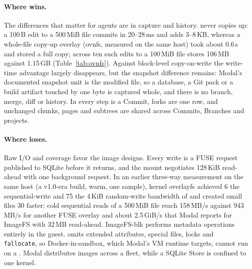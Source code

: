 \paragraph{Where \sys{} wins.} The differences that matter for agents are in capture and
history. \sys{} never copies up: a 100\,B edit to a 500\,MiB file commits in 20--28\,ms
and adds 3--8\,KB, whereas a whole-file copy-up overlay (ovnfs, measured on the same
host) took about 0.6\,s and stored a full copy; across ten such edits to a 100\,MiB file
\sys{} stores 106\,MB against 1.15\,GB (Table~\ref{tab:ovnfs}). Against block-level
copy-on-write the write-time advantage largely disappears, but the snapshot difference
remains: Modal's documented snapshot unit is the modified file, so a database, a Git
pack or a build artifact touched by one byte is captured whole, and there is no
branch, merge, diff or history. In \sys{} every step is a Commit, forks are one row,
and unchanged chunks, pages and subtrees are shared across Commits, Branches and
projects.

\paragraph{Where \sys{} loses.} Raw I/O and coverage favor the image designs. Every
\sys{} write is a FUSE request published to SQLite before it returns, and the mount
negotiates 128\,KiB read-ahead with one background request. In an earlier three-way
measurement on the same host (a v1.0-era build, warm, one sample), kernel overlayfs
achieved 6\X{} the sequential-write and 75\X{} the 4\,KiB random-write bandwidth of
\sys{} and created small files 30\X{} faster; cold sequential reads of a 500\,MiB file
reach 158\,MB/s against 943\,MB/s for another FUSE overlay and about 2.5\,GiB/s that
Modal reports for ImageFS with 32\,MB read-ahead. ImageFS-blk performs metadata
operations entirely in the guest. \sys{} omits extended attributes, special files, locks
and \texttt{fallocate}, so Docker-in-sandbox, which Modal's VM runtime targets, cannot
run on a \ws{}. Modal distributes images across a fleet, while a \sys{} SQLite Store is
confined to one kernel.

